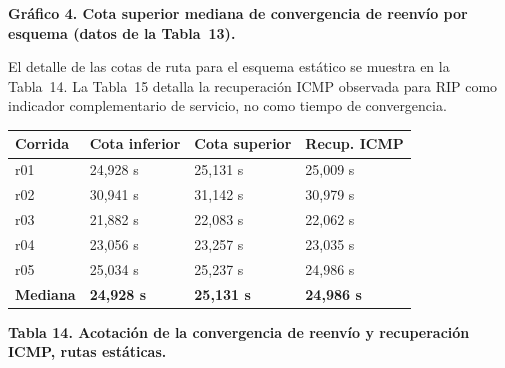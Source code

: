 \documentclass[11pt,a4paper]{article}
\newcommand{\figcaption}[1]{\par\noindent\footnotesize\textbf{#1}\par\vspace{0.4cm}}
\begin{document}
\needspace{1cm}
\begin{center}
\begin{minipage}{0.8\linewidth}
\centering
{}
\figcaption{Gr\'afico 4. Cota superior mediana de convergencia de reenv\'io por esquema (datos de la Tabla~13).}
\end{minipage}
\end{center}

El detalle de las cotas de ruta para el esquema est\'atico se muestra en la Tabla~14. La Tabla~15 detalla la recuperaci\'on ICMP observada para RIP como indicador complementario de servicio, no como tiempo de convergencia.

\needspace{1cm}
\begin{center}
\begin{minipage}{0.9\linewidth}
\centering
\small
\setlength{\tabcolsep}{3pt}
\begin{tabular}{@{}p{2cm}p{4cm}p{4cm}p{3cm}@{}}
\toprule
\textbf{Corrida} & \textbf{Cota inferior} & \textbf{Cota superior} & \textbf{Recup. ICMP} \\
\midrule
r01 & 24,928 s & 25,131 s & 25,009 s \\
r02 & 30,941 s & 31,142 s & 30,979 s \\
r03 & 21,882 s & 22,083 s & 22,062 s \\
r04 & 23,056 s & 23,257 s & 23,035 s \\
r05 & 25,034 s & 25,237 s & 24,986 s \\
\midrule
\textbf{Mediana} & \textbf{24,928 s} & \textbf{25,131 s} & \textbf{24,986 s} \\
\bottomrule
\end{tabular}
\par\vspace{0.1cm}
\figcaption{Tabla 14. Acotaci\'on de la convergencia de reenv\'io y recuperaci\'on ICMP, rutas est\'aticas.}
\end{minipage}
\end{center}
\end{document}

